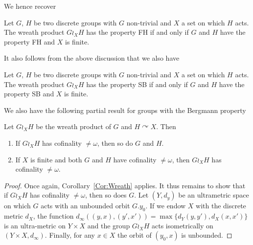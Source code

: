 We hence recover
\begin{prop}
Let $G$, $H$ be two discrete groups with $G$ non-trivial and $X$ a set on which $H$ acts. The wreath product $G \wr_X H$ has the property FH if and only if $G$ and $H$ have the property FH and $X$ is finite.
\end{prop}
%
It also follows from the above discussion that we also have
\begin{prop}
Let $G$, $H$ be two discrete groups with $G$ non-trivial and $X$ a set on which $H$ acts. The wreath product $G \wr_X H$ has the property SB if and only if $G$ and $H$ have the property SB and $X$ is finite.
\end{prop}
%
%
We also have the following partial result for groups with the Bergmann property
\begin{prop}\label{Prop:Cof}
Let $G\wr_X H$ be the wreath product of $G$ and $H\curvearrowright X$.
Then
\begin{enumerate}
\item
If $G\wr_X H$ has cofinality $\neq\omega$, then so do $G$ and $H$.
\item
If $X$ is finite and both $G$ and $H$ have cofinality $\neq\omega$, then $G\wr_X H$ has cofinality $\neq\omega$.
\end{enumerate}
\end{prop}
\begin{proof}
Once again, Corollary~\ref{Cor:Wreath} applies.
It thus remains to show that if $G\wr_X H$ has cofinality $\neq\omega$, then so does $G$.
Let $(Y,d_y)$ be an ultrametric space on which $G$ acts with an unbounded orbit $G.y_0$.
If we endow $X$ with the discrete metric $d_X$, the function $d_\infty((y,x),(y',x'))=\max\{d_Y(y,y'),d_X(x,x')\}$ is an ultra-metric on $Y\times X$ and the group $G\wr_X H$ acts isometrically on $(Y\times X,d_\infty)$.
Finally, for any $x\in X$ the orbit of $(y_0,x)$ is unbounded.
\end{proof}



